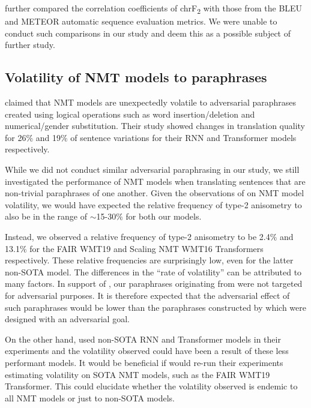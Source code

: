 \documentclass[11pt,a4paper]{article}
\begin{document}
\citet{michel2019evaluation} further compared the correlation coefficients of chrF\textsubscript{2} with those from the BLEU \cite{papineni2002bleu} and METEOR \cite{denkowski2014meteor} automatic sequence evaluation metrics. We were unable to conduct such comparisons in our study and deem this as a possible subject of further study. 

\subsection{Volatility of NMT models to paraphrases}

\citet{fadaee2020unreasonable} claimed that NMT models are unexpectedly volatile to adversarial paraphrases created using logical operations such as word insertion/deletion and numerical/gender substitution. Their study showed changes in translation quality for 26$\%$ and 19$\%$ of sentence variations for their RNN and Transformer models respectively.

While we did not conduct similar adversarial paraphrasing in our study, we still investigated the performance of NMT models when translating sentences that are non-trivial paraphrases of one another. Given the observations of \citet{fadaee2020unreasonable} on NMT model volatility, we would have expected the relative frequency of type-2 anisometry to also be in the range of $\sim$15-30$\%$ for both our models.

Instead, we observed a relative frequency of type-2 anisometry to be 2.4$\%$ and 13.1$\%$ for the FAIR WMT19 and Scaling NMT WMT16 Transformers respectively. These relative frequencies are surprisingly low, even for the latter non-SOTA model. The differences in the ``rate of volatility'' can be attributed to many factors. In support of \citet{fadaee2020unreasonable}, our paraphrases originating from \citet{freitag-bleu-paraphrase-references-2020} were not targeted for adversarial purposes. It is therefore expected that the adversarial effect of such paraphrases would be lower than the paraphrases constructed by \citet{fadaee2020unreasonable} which were designed with an adversarial goal.

On the other hand, \citet{fadaee2020unreasonable} used non-SOTA RNN and Transformer models in their experiments and the volatility observed could have been a result of these less performant models. It would be beneficial if \citet{fadaee2020unreasonable} would re-run their experiments estimating volatility on SOTA NMT models, such as the FAIR WMT19 Transformer. This could elucidate whether the volatility observed is endemic to all NMT models or just to non-SOTA models. 
\end{document}
